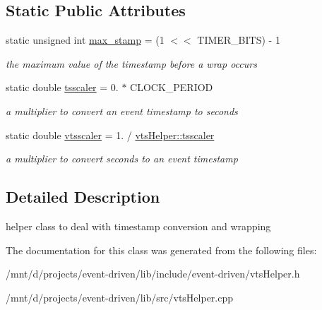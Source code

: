 \subsection*{Static Public Attributes}
\begin{DoxyCompactItemize}
\item 
\mbox{\label{classev_1_1vtsHelper_a059fdcf455b471e69446e565ed017f65}} 
static unsigned int \hyperlink{classev_1_1vtsHelper_a059fdcf455b471e69446e565ed017f65}{max\+\_\+stamp} = (1 $<$$<$ T\+I\+M\+E\+R\+\_\+\+B\+I\+TS) -\/ 1
\begin{DoxyCompactList}\small\item\em the maximum value of the timestamp before a wrap occurs \end{DoxyCompactList}\item 
\mbox{\label{classev_1_1vtsHelper_ad3ad427d18c24f9655bbc73295abf678}} 
static double \hyperlink{classev_1_1vtsHelper_ad3ad427d18c24f9655bbc73295abf678}{tsscaler} = 0. $\ast$ C\+L\+O\+C\+K\+\_\+\+P\+E\+R\+I\+OD
\begin{DoxyCompactList}\small\item\em a multiplier to convert an event timestamp to seconds \end{DoxyCompactList}\item 
\mbox{\label{classev_1_1vtsHelper_afa2dd46ae7113668bc6ebea88ab8fa11}} 
static double \hyperlink{classev_1_1vtsHelper_afa2dd46ae7113668bc6ebea88ab8fa11}{vtsscaler} = 1. / \hyperlink{classev_1_1vtsHelper_ad3ad427d18c24f9655bbc73295abf678}{vts\+Helper\+::tsscaler}
\begin{DoxyCompactList}\small\item\em a multiplier to convert seconds to an event timestamp \end{DoxyCompactList}\end{DoxyCompactItemize}


\subsection{Detailed Description}
helper class to deal with timestamp conversion and wrapping 

The documentation for this class was generated from the following files\+:\begin{DoxyCompactItemize}
\item 
/mnt/d/projects/event-\/driven/lib/include/event-\/driven/vts\+Helper.\+h\item 
/mnt/d/projects/event-\/driven/lib/src/vts\+Helper.\+cpp\end{DoxyCompactItemize}
